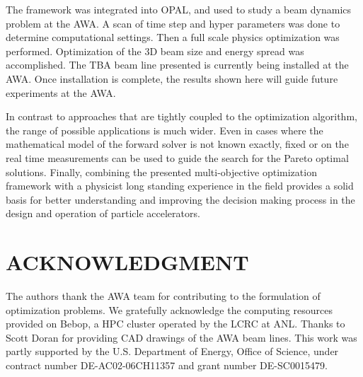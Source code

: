 \documentclass[%
reprint,
amsmath,amssymb,
aps,
prstab,
]{revtex4-1}
\begin{document}
%
%  
%
The framework was integrated into OPAL, and used 
to study a beam dynamics problem at the AWA.
A scan of time step and hyper parameters was done to determine computational settings.
Then a full scale physics optimization was performed.
Optimization of the 3D beam size and energy spread was accomplished.
The TBA beam line presented is currently being installed at the AWA.
Once installation is complete, 
the results shown here will guide future experiments at the AWA.

In contrast to approaches that are tightly coupled to the optimization
  algorithm, the range of possible applications is much wider.
Even in cases where the mathematical model of the forward solver is not known
  exactly, fixed or on the real time measurements can be used to guide the
  search for the Pareto optimal solutions.
Finally, combining the presented multi-objective optimization framework with
  a physicist long standing experience in the field provides a solid basis
  for better understanding and improving the decision making process in the
  design and operation of particle accelerators.

 


\section{ACKNOWLEDGMENT}

The authors thank the AWA team for contributing to the
  formulation of optimization problems. 
  We gratefully acknowledge the computing resources provided on Bebop,
  a HPC cluster operated by the LCRC at ANL.
  Thanks to Scott Doran for providing CAD drawings of the AWA beam lines.
  This work was partly supported by the 
  U.S. Department of Energy, Office of Science, under 
  contract number DE-AC02-06CH11357 and grant number DE-SC0015479. 
\end{document}

